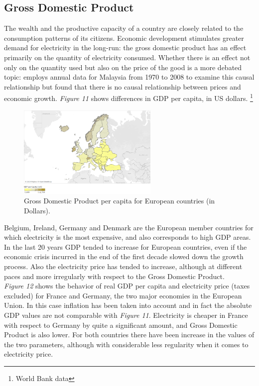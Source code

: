 \documentclass{book}
\begin{document}
\subsection*{Gross Domestic Product}

The wealth and the productive capacity of a country are closely related to the consumption patterns of its citizens. Economic development stimulates greater demand for electricity in the long-run: the gross domestic product has an effect primarily on the quantity of electricity consumed. \cite{jamil2010relationship} Whether there is an effect not only on the quantity used but also on the price of the good is a more debated topic: \cite{lean2010multivariate} employs annual data for Malaysia from 1970 to 2008 to examine this causal relationship but found that there is no causal relationship between prices and economic growth. \textit{Figure 11} shows differences in GDP per capita, in US dollars. \footnote{World Bank data}

\bigskip
\begin{figure}[H]
\begin{center}
\captionsetup{justification=centering}
\includegraphics[width=0.6\textwidth]{Images/gdp.png}
\caption{Gross Domestic Product per capita for European countries (in Dollars). }
\end{center}
\end{figure}
\bigskip

Belgium, Ireland, Germany and Denmark are the European member countries for which electricity is the most expensive, and also corresponds to high GDP areas. In the last 20 years GDP tended to increase for European countries, even if the economic crisis incurred in the end of the first decade slowed down the growth process. Also the electricity price has tended to increase, although at different paces and more irregularly with respect to the Gross Domestic Product.\\

\textit{Figure 12} shows the behavior of real GDP per capita and electricity price (taxes excluded) for France and Germany, the two major economies in the European Union.  In this case inflation has been taken into account and in fact the absolute GDP values are not comparable with \textit{Figure 11}. Electricity is cheaper in France with respect to Germany by quite a significant amount, and Gross Domestic Product is also lower. For both countries there have been increase in the values of the two parameters, although with considerable less regularity when it comes to electricity price.
\end{document}
